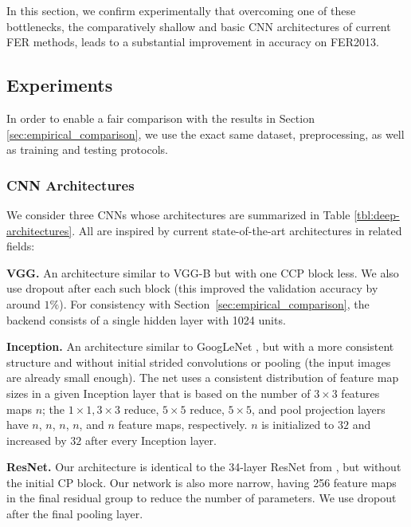 \documentclass[conference,10pt,a4paper]{IEEEtran}
\begin{document}
In this section, we confirm experimentally that overcoming one of these bottlenecks, the comparatively shallow and basic CNN architectures of current FER methods, leads to a substantial improvement in accuracy on FER2013.

\subsection{Experiments} \label{sub:experiments}

In order to enable a fair comparison with the results in Section \ref{sec:empirical_comparison}, we use the exact same dataset, preprocessing, as well as training and testing protocols. 

\subsubsection{CNN Architectures} \label{ssub:cnn_architectures}



We consider three CNNs whose architectures are summarized in Table \ref{tbl:deep-architectures}. All are inspired by current state-of-the-art architectures in related fields:

\textbf{VGG.} An architecture similar to VGG-B \cite{simonyan14} but with one CCP block less. We also use dropout after each such block (this improved the validation accuracy by around $1\%$). For consistency with Section\ \ref{sec:empirical_comparison}, the backend consists of a single hidden layer with 1024 units.

\textbf{Inception.} An architecture similar to GoogLeNet \cite{szegedy15}, but with a more consistent structure and without initial strided convolutions or pooling (the input images are already small enough). The net uses a consistent distribution of feature map sizes in a given Inception layer that is based on the number of $3\times3$ features maps $n$; the $1\times1, 3\times3$ reduce, $5\times5$ reduce, $5\times5$, and pool projection layers have $n$, $n$, $n$, $n$, and $n$ feature maps, respectively. $n$ is initialized to $32$ and increased by $32$ after every Inception layer.

\textbf{ResNet.} Our architecture is identical to the 34-layer ResNet from \cite{he15}, but without the initial CP block. Our network is also more narrow, having 256 feature maps in the final residual group to reduce the number of parameters. We use dropout after the final pooling layer.
\end{document}
